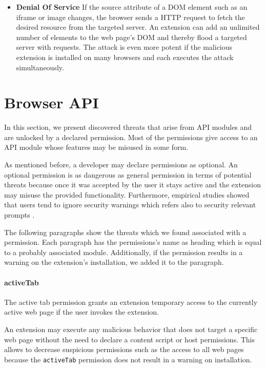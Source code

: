 \begin{itemize}
		\item \textbf{Denial Of Service} If the source attribute of a DOM element such as an iframe or image changes, the browser sends a HTTP request to fetch the desired resource from the targeted server. An extension can add an unlimited number of elements to the web page's DOM and thereby flood a targeted server with requests. The attack is even more potent if the malicious extension is installed on many browsers and each executes the attack simultaneously.
	\end{itemize}
	
\section{Browser API}
\label{sec:threatAnalysis:api}
	
	In this section, we present discovered threats that arise from API modules and are unlocked by a declared permission. Most of the permissions give access to an API module whose features may be misused in some form. 
	
	As mentioned before, a developer may declare permissions as optional. An optional permission is as dangerous as general permission in terms of potential threats because once it was accepted by the user it stays active and the extension may misuse the provided functionality. Furthermore, empirical studies showed that users tend to ignore security warnings which refers also to security relevant prompts \cite{180371, sunshine2009crying}.
		
	The following paragraphs show the threats which we found associated with a permission. Each paragraph has the permissions's name as heading which is equal to a probably associated module. Additionally, if the permission results in a warning on the extension's installation, we added it to the paragraph.
	
\newenvironment{permissionwarning}{%
	\setlength\topsep{4pt}
	\setlength\parskip{0pt}
	\itshape
\begin{center}
	}{%
\end{center}
}

\paragraph{activeTab}
	The active tab permission grants an extension temporary access to the currently active web page if the user invokes the extension. 
	
	An extension may execute any malicious behavior that does not target a specific web page without the need to declare a content script or host permissions. This allows to decrease suspicious permissions such as the access to all web pages because the \texttt{activeTab} permission does not result in a warning on installation.

